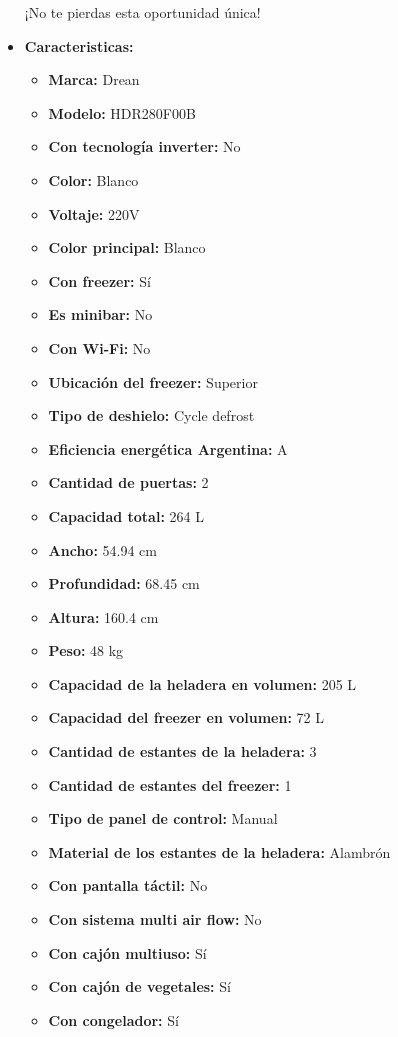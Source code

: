 \documentclass{article}
\begin{document}
\begin{adjustwidth}{2em}{}
\begin{itemize}
¡No te pierdas esta oportunidad única!
        \item \textbf{Caracteristicas:} 
        \begin{itemize}
            \item \textbf {Marca:} Drean
    \item \textbf {Modelo:} HDR280F00B
    \item \textbf {Con tecnología inverter:} No
    \item \textbf {Color:} Blanco
    \item \textbf {Voltaje:} 220V
    \item \textbf {Color principal:} Blanco
    \item \textbf {Con freezer:} Sí
    \item \textbf {Es minibar:} No
    \item \textbf {Con Wi-Fi:} No
    \item \textbf {Ubicación del freezer:} Superior
    \item \textbf {Tipo de deshielo:} Cycle defrost
    \item \textbf {Eficiencia energética Argentina:} A
    \item \textbf {Cantidad de puertas:} 2
    \item \textbf {Capacidad total:} 264 L
    \item \textbf {Ancho:} 54.94 cm
    \item \textbf {Profundidad:} 68.45 cm
    \item \textbf {Altura:} 160.4 cm
    \item \textbf {Peso:} 48 kg
    \item \textbf {Capacidad de la heladera en volumen:} 205 L
    \item \textbf {Capacidad del freezer en volumen:} 72 L
    \item \textbf {Cantidad de estantes de la heladera:} 3
    \item \textbf {Cantidad de estantes del freezer:} 1
    \item \textbf {Tipo de panel de control:} Manual
    \item \textbf {Material de los estantes de la heladera:} Alambrón
    \item \textbf {Con pantalla táctil:} No
    \item \textbf {Con sistema multi air flow:} No
    \item \textbf {Con cajón multiuso:} Sí
    \item \textbf {Con cajón de vegetales:} Sí
    \item \textbf {Con congelador:} Sí

\end{itemize}
\end{itemize}
\end{adjustwidth}
\end{document}
